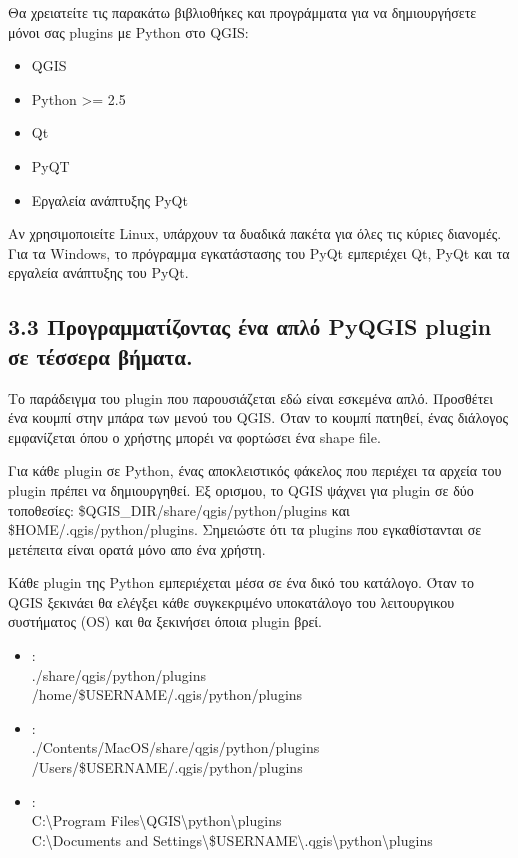 Θα χρειατείτε τις παρακάτω βιβλιοθήκες και προγράμματα για να δημιουργήσετε μόνοι σας plugins με Python στο QGIS:

\begin{itemize}
\item QGIS
\item Python >= 2.5
\item Qt
\item PyQT
\item Εργαλεία ανάπτυξης PyQt
\end{itemize}

Αν χρησιμοποιείτε Linux, υπάρχουν τα δυαδικά πακέτα για όλες τις κύριες διανομές. Για τα Windows, το πρόγραμμα εγκατάστασης του PyQt εμπεριέχει Qt, PyQt και τα εργαλεία ανάπτυξης του PyQt. 

\subsection{3.3 Προγραμματίζοντας ένα απλό PyQGIS plugin σε τέσσερα βήματα.}\label{subsec:pyfoursteps}

Το παράδειγμα του plugin που παρουσιάζεται εδώ είναι εσκεμένα απλό. Προσθέτει ένα κουμπί στην μπάρα των μενού του QGIS. Όταν το κουμπί πατηθεί, ένας διάλογος εμφανίζεται όπου ο χρήστης μπορέι να φορτώσει ένα shape file.

Για κάθε plugin σε Python, ένας αποκλειστικός φάκελος που περιέχει τα αρχεία του plugin πρέπει να δημιουργηθεί. Εξ ορισμου, το QGIS ψάχνει για plugin σε δύο τοποθεσίες: \$QGIS\_DIR/share/qgis/python/plugins και \$HOME/.qgis/python/plugins.
Σημειώστε ότι τα plugins που εγκαθίστανται σε μετέπειτα είναι ορατά μόνο απο ένα χρήστη. 


Κάθε plugin της Python εμπεριέχεται μέσα σε ένα δικό του κατάλογο. Όταν το QGIS ξεκινάει θα ελέγξει κάθε συγκεκριμένο υποκατάλογο του λειτουργικου συστήματος (OS) και θα ξεκινήσει όποια plugin βρεί.  

\begin{itemize}
\item {}:\\
./share/qgis/python/plugins \\
/home/\$USERNAME/.qgis/python/plugins
\item {}:\\
./Contents/MacOS/share/qgis/python/plugins \\
/Users/\$USERNAME/.qgis/python/plugins
\item {}:\\
C:\textbackslash Program Files\textbackslash QGIS\textbackslash python\textbackslash plugins \\
C:\textbackslash Documents and Settings\textbackslash\$USERNAME\textbackslash .qgis\textbackslash python\textbackslash plugins

\end{itemize}

